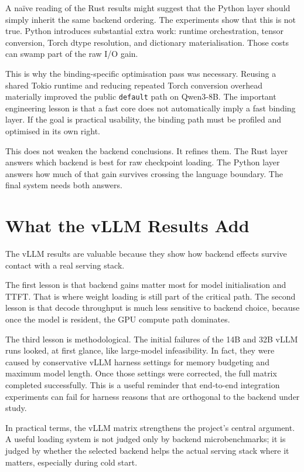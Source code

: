 A naïve reading of the Rust results might suggest that the Python layer should simply inherit the same backend ordering. The experiments show that this is not true. Python introduces substantial extra work: runtime orchestration, tensor conversion, Torch dtype resolution, and dictionary materialisation. Those costs can swamp part of the raw I/O gain.

This is why the binding-specific optimisation pass was necessary. Reusing a shared Tokio runtime and reducing repeated Torch conversion overhead materially improved the public \texttt{default} path on Qwen3-8B. The important engineering lesson is that a fast core does not automatically imply a fast binding layer. If the goal is practical usability, the binding path must be profiled and optimised in its own right.

This does not weaken the backend conclusions. It refines them. The Rust layer answers which backend is best for raw checkpoint loading. The Python layer answers how much of that gain survives crossing the language boundary. The final system needs both answers.

\section{What the vLLM Results Add}

The vLLM results are valuable because they show how backend effects survive contact with a real serving stack.

The first lesson is that backend gains matter most for model initialisation and TTFT. That is where weight loading is still part of the critical path. The second lesson is that decode throughput is much less sensitive to backend choice, because once the model is resident, the GPU compute path dominates.

The third lesson is methodological. The initial failures of the 14B and 32B vLLM runs looked, at first glance, like large-model infeasibility. In fact, they were caused by conservative vLLM harness settings for memory budgeting and maximum model length. Once those settings were corrected, the full matrix completed successfully. This is a useful reminder that end-to-end integration experiments can fail for harness reasons that are orthogonal to the backend under study.

In practical terms, the vLLM matrix strengthens the project's central argument. A useful loading system is not judged only by backend microbenchmarks; it is judged by whether the selected backend helps the actual serving stack where it matters, especially during cold start.

